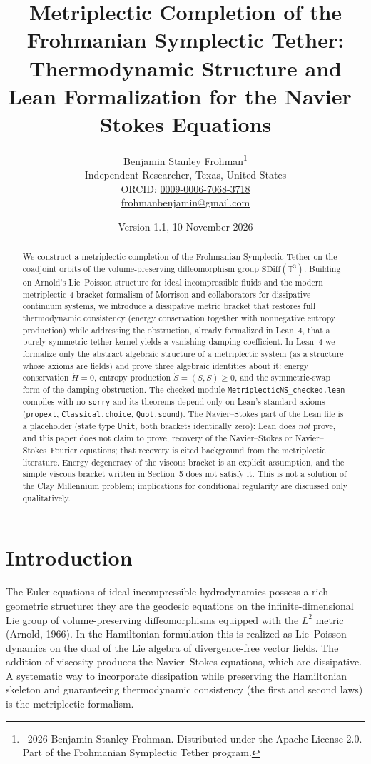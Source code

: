 \documentclass[11pt,a4paper]{article}
\title{\textbf{Metriplectic Completion of the Frohmanian Symplectic Tether:\\
Thermodynamic Structure and Lean Formalization for the Navier--Stokes Equations}}
\author{Benjamin Stanley Frohman\thanks{\textcopyright\ 2026 Benjamin Stanley Frohman. Distributed under the Apache License 2.0. Part of the Frohmanian Symplectic Tether program.}\\
Independent Researcher, Texas, United States\\
ORCID: \href{https://orcid.org/0009-0006-7068-3718}{0009-0006-7068-3718}\\
\href{mailto:frohmanbenjamin@gmail.com}{frohmanbenjamin@gmail.com}}
\date{Version 1.1, 10 November 2026}
\begin{document}
\maketitle

\begin{abstract}
We construct a metriplectic completion of the Frohmanian Symplectic Tether on the coadjoint orbits of the volume-preserving diffeomorphism group \(\mathrm{SDiff}(\mathbb{T}^3)\). Building on Arnold's Lie--Poisson structure for ideal incompressible fluids and the modern metriplectic 4-bracket formalism of Morrison and collaborators for dissipative continuum systems, we introduce a dissipative metric bracket that restores full thermodynamic consistency (energy conservation together with nonnegative entropy production) while addressing the obstruction, already formalized in Lean~4, that a purely symmetric tether kernel yields a vanishing damping coefficient. In Lean~4 we formalize only the abstract algebraic structure of a metriplectic system (as a structure whose axioms are fields) and prove three algebraic identities about it: energy conservation \(\dot H=0\), entropy production \(\dot S=(S,S)\ge0\), and the symmetric-swap form of the damping obstruction. The checked module \texttt{MetriplecticNS\_checked.lean} compiles with no \texttt{sorry} and its theorems depend only on Lean's standard axioms (\texttt{propext}, \texttt{Classical.choice}, \texttt{Quot.sound}). The Navier--Stokes part of the Lean file is a placeholder (state type \texttt{Unit}, both brackets identically zero): Lean does \emph{not} prove, and this paper does not claim to prove, recovery of the Navier--Stokes or Navier--Stokes--Fourier equations; that recovery is cited background from the metriplectic literature. Energy degeneracy of the viscous bracket is an explicit assumption, and the simple viscous bracket written in Section~5 does not satisfy it. This is not a solution of the Clay Millennium problem; implications for conditional regularity are discussed only qualitatively.
\end{abstract}

\tableofcontents

\section{Introduction}
The Euler equations of ideal incompressible hydrodynamics possess a rich geometric structure: they are the geodesic equations on the infinite-dimensional Lie group of volume-preserving diffeomorphisms equipped with the \(L^2\) metric (Arnold, 1966). In the Hamiltonian formulation this is realized as Lie--Poisson dynamics on the dual of the Lie algebra of divergence-free vector fields. The addition of viscosity produces the Navier--Stokes equations, which are dissipative. A systematic way to incorporate dissipation while preserving the Hamiltonian skeleton and guaranteeing thermodynamic consistency (the first and second laws) is the metriplectic formalism.
\end{document}
